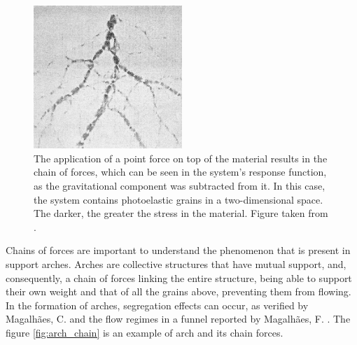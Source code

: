 \begin{figure}
    \centering
    \includegraphics[width=0.5\textwidth]{04-figuras/Cadeia_Forca.png}
    \caption{The application of a point force on top of the material results in the chain of forces, which can be seen in the system's response function, as the gravitational component was subtracted from it. In this case, the system contains photoelastic grains in a two-dimensional space. The darker, the greater the stress in the material. Figure taken from \cite{Sensitivity_of_Stress_Response_Function_to_Packing_Preparation}.}
    \label{fig:force_chain}
\end{figure}


    Chains of forces are important to understand the phenomenon that is present in support arches. Arches are collective structures that have mutual support, and, consequently, a chain of forces linking the entire structure, being able to support their own weight and that of all the grains above, preventing them from flowing. In the formation of arches, segregation effects can occur, as verified by Magalhães, C. \cite{Caio-Tese} and the flow regimes in a funnel reported by Magalhães, F. \cite{Felipe-Tese}. The figure \ref{fig:arch_chain} is an example of arch and its chain forces.

